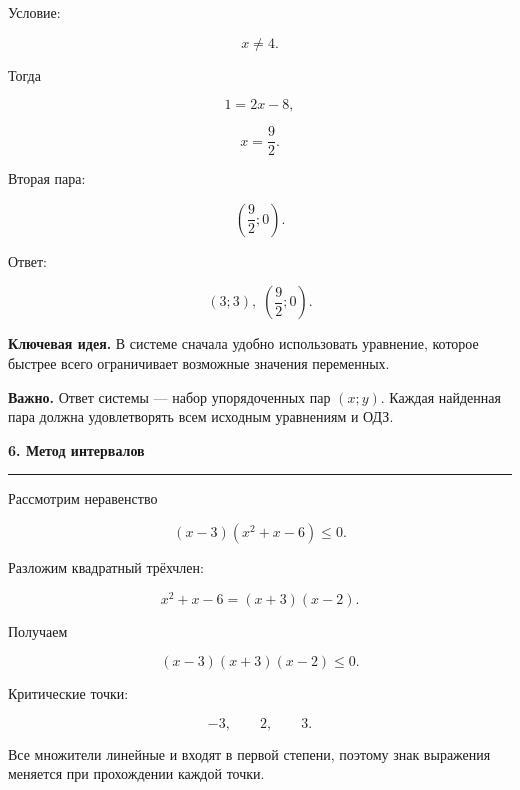 \documentclass[a4paper,12pt]{article}
\newcommand{\topic}[1]{%
    \vspace{0.5em}
    {\Large\bfseries\textcolor{darkaccent}{#1}}\par
    \vspace{0.2em}
    {\color{accent}\rule{\linewidth}{0.7pt}}
    \vspace{0.5em}
}
\newcommand{\keyidea}[1]{%
    \par\smallskip
    \textbf{\textcolor{darkaccent}{Ключевая идея.}} #1
    \par\smallskip
}
\newcommand{\warning}[1]{%
    \par\smallskip
    \textbf{\textcolor{accent}{Важно.}} #1
    \par\smallskip
}
\begin{document}
Условие:

\[
x\ne4.
\]

Тогда

\[
1=2x-8,
\]

\[
x=\frac92.
\]

Вторая пара:

\[
\left(\frac92;0\right).
\]

Ответ:

\[
\boxed{
(3;3),\;
\left(\frac92;0\right)
}.
\]

\keyidea{
В системе сначала удобно использовать уравнение, которое быстрее всего ограничивает возможные значения переменных.
}

\warning{
Ответ системы --- набор упорядоченных пар \((x;y)\). Каждая найденная пара должна удовлетворять всем исходным уравнениям и ОДЗ.
}


\topic{6. Метод интервалов}

Рассмотрим неравенство

\[
(x-3)(x^2+x-6)\le0.
\]

Разложим квадратный трёхчлен:

\[
x^2+x-6=(x+3)(x-2).
\]

Получаем

\[
(x-3)(x+3)(x-2)\le0.
\]

Критические точки:

\[
-3,\qquad 2,\qquad 3.
\]

Все множители линейные и входят в первой степени, поэтому знак выражения меняется при прохождении каждой точки.

\begin{center}
\end{center}
\end{document}
